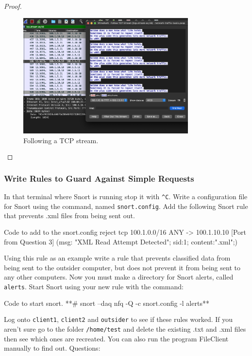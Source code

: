 \documentclass[a4paper,11pt,hidelinks]{article}
\begin{document}
\begin{proof}
    \begin{figure}[ht!]
        \centering
        \includegraphics[width=0.8\textwidth]{../drawable/follow-stream.png}
        \caption{Following a TCP stream.}
        \label{fig:follow}
    \end{figure}
\end{proof}

\clearpage

\subsubsection{Write Rules to Guard Against Simple Requests}

In that terminal where Snort is running stop it with \verb=^C=. Write a configuration file for Snort using the command, named \verb=snort.config=. Add the following Snort rule that prevents .xml files from being sent out.

\begin{code}{Code to add to the snort.config}
reject tcp 100.1.0.0/16 ANY -> 100.1.10.10 [Port from Question 3]
    (msg: "XML Read Attempt Detected"; sid:1; content:".xml";)
\end{code}

Using this rule as an example write a rule that prevents classified data from being sent to the outsider computer, but does not prevent it from being sent to any other computers. Now you must make a directory for Snort alerts, called \verb=alerts=. Start Snort using your new rule with the command:

\begin{code}{Code to start snort.}
**# snort --daq nfq -Q -c snort.config -l alerts**
\end{code}

Log onto \verb=client1=, \verb=client2= and \verb=outsider= to see if these rules worked. If you aren't sure go to the folder \verb=/home/test= and delete the existing .txt and .xml files then see which ones are recreated. You can also run the program FileClient manually to find out.
Questions:
\end{document}
